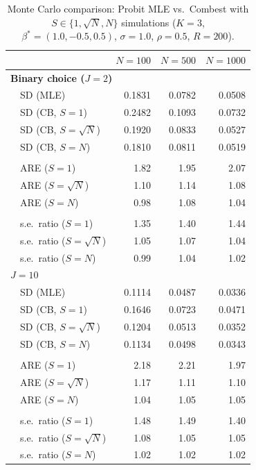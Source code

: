 \begin{table}[t]
\centering
\caption{Monte Carlo comparison: Probit MLE vs.\ Combest with $S \in \{1, \sqrt{N}, N\}$ simulations
($K=3$, $\beta^*=(1.0,-0.5,0.5)$, $\sigma=1.0$, $\rho=0.5$, $R=200$).}
\label{tab:unit_demand_probit_efficiency}
\small
\begin{tabular}{llrrr}
\toprule
 & & $N=100$ & $N=500$ & $N=1000$ \\
\midrule
\multicolumn{5}{l}{\textbf{Binary choice ($J=2$)}} \\[2pt]
  & SD (MLE) & 0.1831 & 0.0782 & 0.0508 \\
  & SD (CB, $S{=}1$) & 0.2482 & 0.1093 & 0.0732 \\
  & SD (CB, $S{=}\sqrt{N}$) & 0.1920 & 0.0833 & 0.0527 \\
  & SD (CB, $S{=}N$) & 0.1810 & 0.0811 & 0.0519 \\
  \\[-4pt]
  & ARE ($S{=}1$) & 1.82 & 1.95 & 2.07 \\
  & ARE ($S{=}\sqrt{N}$) & 1.10 & 1.14 & 1.08 \\
  & ARE ($S{=}N$) & 0.98 & 1.08 & 1.04 \\
  \\[-4pt]
  & s.e.\ ratio ($S{=}1$) & 1.35 & 1.40 & 1.44 \\
  & s.e.\ ratio ($S{=}\sqrt{N}$) & 1.05 & 1.07 & 1.04 \\
  & s.e.\ ratio ($S{=}N$) & 0.99 & 1.04 & 1.02 \\
\midrule
\multicolumn{5}{l}{\textbf{$J=10$}} \\[2pt]
  & SD (MLE) & 0.1114 & 0.0487 & 0.0336 \\
  & SD (CB, $S{=}1$) & 0.1646 & 0.0723 & 0.0471 \\
  & SD (CB, $S{=}\sqrt{N}$) & 0.1204 & 0.0513 & 0.0352 \\
  & SD (CB, $S{=}N$) & 0.1134 & 0.0498 & 0.0343 \\
  \\[-4pt]
  & ARE ($S{=}1$) & 2.18 & 2.21 & 1.97 \\
  & ARE ($S{=}\sqrt{N}$) & 1.17 & 1.11 & 1.10 \\
  & ARE ($S{=}N$) & 1.04 & 1.05 & 1.05 \\
  \\[-4pt]
  & s.e.\ ratio ($S{=}1$) & 1.48 & 1.49 & 1.40 \\
  & s.e.\ ratio ($S{=}\sqrt{N}$) & 1.08 & 1.05 & 1.05 \\
  & s.e.\ ratio ($S{=}N$) & 1.02 & 1.02 & 1.02 \\
\bottomrule
\end{tabular}
\end{table}